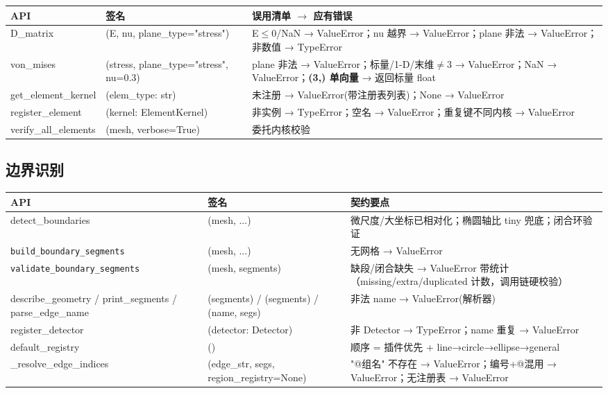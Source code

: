 \documentclass[12pt,a4paper]{ctexart}
\begin{document}
\begin{longtable}{p{4.2cm}p{4.0cm}p{6.0cm}}
\toprule
\textbf{API} & \textbf{签名} & \textbf{误用清单 $\to$ 应有错误} \\
\midrule
D\_matrix & (E, nu, plane\_type="stress") & E$\leq$0/NaN → ValueError；nu 越界 → ValueError；plane 非法 → ValueError；非数值 → TypeError \\
von\_mises & (stress, plane\_type="stress", nu=0.3) & plane 非法 → ValueError；标量/1-D/末维$\neq$3 → ValueError；NaN → ValueError；\textbf{(3,) 单向量} → 返回标量 float \\
get\_element\_kernel & (elem\_type: str) & 未注册 → ValueError(带注册表列表)；None → ValueError \\
register\_element & (kernel: ElementKernel) & 非实例 → TypeError；空名 → ValueError；重复键不同内核 → ValueError \\
verify\_all\_elements & (mesh, verbose=True) & 委托内核校验 \\
\bottomrule
\end{longtable}

\subsection{边界识别}

\begin{longtable}{p{4.2cm}p{4.0cm}p{6.0cm}}
\toprule
\textbf{API} & \textbf{签名} & \textbf{契约要点} \\
\midrule
detect\_boundaries & (mesh, ...) & 微尺度/大坐标已相对化；椭圆轴比 tiny 兜底；闭合环验证 \\
\texttt{build\_boundary\_\newline segments} & (mesh, ...) & 无网格 → ValueError \\
\texttt{validate\_boundary\_\-segments} & (mesh, segments) & 缺段/闭合缺失 → ValueError 带统计（missing/extra/duplicated 计数，调用链硬校验） \\
describe\_geometry / print\_segments / parse\_edge\_name & (segments) / (segments) / (name, segs) & 非法 name → ValueError(解析器) \\
register\_detector & (detector: Detector) & 非 Detector → TypeError；name 重复 → ValueError \\
default\_registry & () & 顺序 = 插件优先 + line→circle→ellipse→general \\
\_resolve\_edge\_indices & (edge\_str, segs, region\_registry=None) & "@组名" 不存在 → ValueError；编号+@混用 → ValueError；无注册表 → ValueError \\
\bottomrule
\end{longtable}
\end{document}
